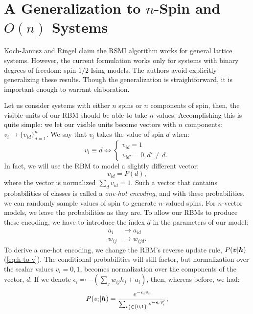 \section{A Generalization to $n$-Spin and $O(n)$ Systems}
Koch-Janusz and Ringel claim the RSMI algorithm works for general
lattice systems.  However, the current formulation works only for
systems with binary degrees of freedom: spin-$1/2$ Ising models. The
authors avoid explicitly generalizing these results.  Though the
generalization is straightforward, it is important enough to warrant
elaboration.

Let us consider systems with either $n$ spins or $n$ components of spin, then, the visible
units of our RBM should be able to take $n$ values. Accomplishing this
is quite simple: we let our visible units become vectors with $n$
components: $v_i\rightarrow \{v_{id}\}_{d=1}^n$.  We say that $v_i$
takes the value of spin $d$ when:
\begin{equation}%
  v_i \equiv d \iff
  \begin{cases}
    v_{id}=1\\
    v_{id'}=0, d'\neq d.
  \end{cases}
\end{equation}%
In fact, we will use the RBM to model a slightly different vector:
\begin{equation}%
  v_{id}=P(d),
\end{equation}%
where the vector is normalized $\sum_d v_{id}=1$. Such a vector that contains
probabilities of classes is called a \textit{one-hot
encoding}, and with these probabilities, we can randomly sample values
of spin to generate $n$-valued spins. For $n$-vector models, we leave
the probabilities as they are. To allow our RBMs to produce these
encoding, we have to introduce the index $d$ in the parameters of our
model:
\begin{align}%
  a_i &\rightarrow a_{id}\\
  w_{ij}&\rightarrow w_{ijd}.
\end{align}%
To derive a one-hot encoding, we change the RBM's reverse update rule,
$P(\boldsymbol{v}\rvert \boldsymbol{h})$ (\ref{eq:h-to-v}).  The conditional probabilities
will still factor, but normalization over the scalar values $v_i=0,1$,
becomes normalization over the components of the vector, $d$.  If we
denote $\epsilon_i \eqcolon -(\sum_j w_{ij} h_j + a_i )$, then, whereas
before, we had:%
\begin{equation}%
  P(v_i\rvert\bh)=\frac{e^{-\epsilon_i v_i}}{\sum_{v_i'\in\{0,1\}} e^{-\epsilon_i v_i'}},
\end{equation}%
